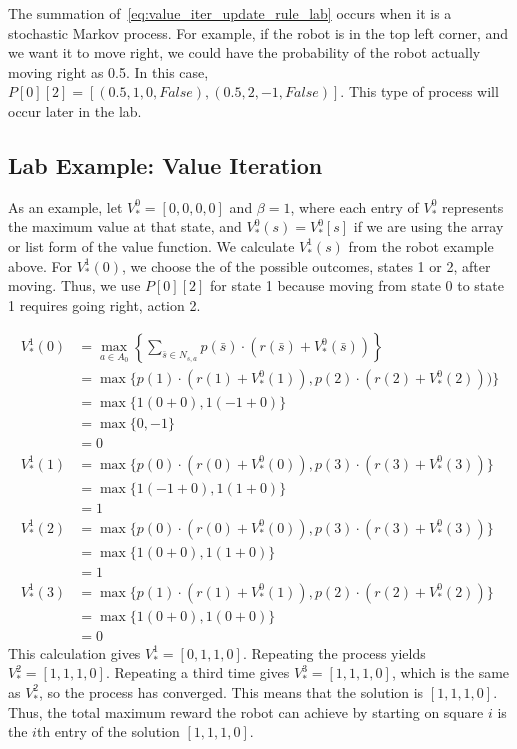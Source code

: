 The summation of\ \ref{eq:value_iter_update_rule_lab} occurs when it is a stochastic Markov process.
For example, if the robot is in the top left corner, and we want it to move right, we could have the probability of the robot actually moving right as 0.5.
In this case, $P[0][2] = [(0.5, 1, 0, False), (0.5, 2, -1, False)]$.
This type of process will occur later in the lab.

\subsection*{Lab Example: Value Iteration}
As an example, let $V_*^0 = [0,0,0,0]$ and $\beta = 1$, where each entry of $V_*^0$ represents the maximum value at that state, and $V_*^0(s) = V_*^0[s]$ if we are using the array or list form of the value function.
We calculate $V_*^1(s)$ from the robot example above.
For $V_*^1(0)$, we choose the  of the possible outcomes, states 1 or 2, after moving.
Thus, we use $P[0][2]$ for state 1 because moving from state 0 to state 1 requires going right, action 2.

\begin{align*}
V_*^1(0) &= \max_{a \in A_0} \left\{\sum_{\bar{s}\in N_{s,a}}p(\bar{s})\cdot(r(\bar{s})+V_*^0(\bar{s}))\right\} \\
&= \max \{p(1)\cdot(r(1)+V_*^0(1)), p(2)\cdot(r(2)+V_*^0(2)))\} \\
&= \max \{1(0+0), 1(-1+0)\} \\
&= \max \{0,-1\} \\
&= 0 \\
V_*^1(1) &= \max \{p(0)\cdot(r(0)+V_*^0(0)), p(3)\cdot(r(3)+V_*^0(3))\} \\
&=\max \{1(-1+0), 1(1+0)\} \\
&= 1 \\
V_*^1(2) &= \max\{p(0)\cdot(r(0)+V_*^0(0)), p(3)\cdot(r(3)+V_*^0(3))\} \\
&=\max \{1(0+0),1(1+0)\} \\
&= 1 \\
V_*^1(3) &= \max\{p(1)\cdot(r(1)+V_*^0(1)), p(2)\cdot(r(2)+V_*^0(2))\} \\
&=\max \{1(0+0),1(0+0)\} \\
&= 0
\end{align*}
This calculation gives $V_*^1 = [0, 1, 1, 0]$.
Repeating the process yields $V_*^2 = [1, 1, 1, 0]$.
Repeating a third time gives $V_*^3 = [1, 1, 1, 0]$, which is the same as $V_*^2$, so the process has converged.
This means that the solution is $[1, 1, 1, 0]$.
Thus, the total maximum reward the robot can achieve by starting on square $i$ is the $i$th entry of the solution $[1, 1, 1, 0]$.


